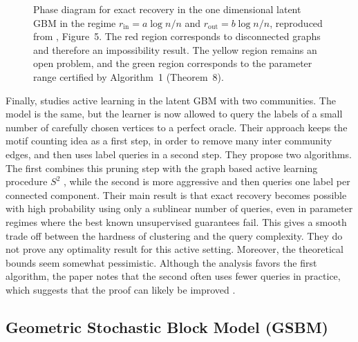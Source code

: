 \documentclass[runningheads]{llncs}
\begin{document}
\begin{figure}[H]
    \centering
    
\caption{Phase diagram for exact recovery in the one dimensional latent GBM in the regime \(r_\mathrm{in}=a\log n/n\) and \(r_\mathrm{out}=b\log n/n\), reproduced from \citet{galhotra2023communityrecoverygeometricblock}, Figure~5. The red region corresponds to disconnected graphs and therefore an impossibility result. The yellow region remains an open problem, and the green region corresponds to the parameter range certified by Algorithm~1 (Theorem~8).}
    \label{fig:GBM}
\end{figure}

Finally, \citep{chien2020active} studies active learning in the latent GBM with two communities. The model is the same, but the learner is now allowed to query the labels of a small number of carefully chosen vertices to a perfect oracle. Their approach keeps the motif counting idea as a first step, in order to remove many inter community edges, and then uses label queries in a second step. They propose two algorithms. The first combines this pruning step with the graph based active learning procedure \(S^2\) \citep{dasarathy2015s2efficientgraphbased}, while the second is more aggressive and then queries one label per connected component. Their main result is that exact recovery becomes possible with high probability using only a sublinear number of queries, even in parameter regimes where the best known unsupervised guarantees fail. This gives a smooth trade off between the hardness of clustering and the query complexity. They do not prove any optimality result for this active setting. Moreover, the theoretical bounds seem somewhat pessimistic. Although the analysis favors the first algorithm, the paper notes that the second often uses fewer queries in practice, which suggests that the proof can likely be improved \citep{chien2020active}.


\subsection{Geometric Stochastic Block Model (GSBM)}
\end{document}
